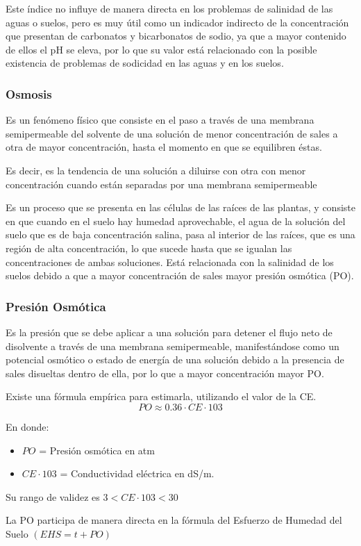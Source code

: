 Este índice no influye de manera directa en los problemas de salinidad de las aguas o suelos, pero es muy útil como un indicador indirecto de la concentración que presentan de carbonatos y bicarbonatos de sodio, ya que a mayor contenido de ellos el pH se eleva, por lo que su valor está relacionado con la posible existencia de problemas de sodicidad en las aguas y en los suelos.

\subsubsection{Osmosis}
Es un fenómeno físico que consiste en el paso a través de una membrana semipermeable del solvente de una solución de menor concentración de sales a otra de mayor concentración, hasta el momento en que se equilibren éstas.

Es decir, es la tendencia de una solución a diluirse con otra con menor concentración cuando están separadas por una membrana semipermeable

Es un proceso que se presenta en las células de las raíces de las plantas, y consiste en que cuando en el suelo hay humedad aprovechable, el agua de la solución del suelo que es de baja concentración salina, pasa al interior de las raíces, que es una región de alta concentración, lo que sucede hasta que se igualan las concentraciones de ambas soluciones. Está relacionada con la salinidad de los suelos debido a que a mayor concentración de sales mayor presión osmótica (PO).

\subsubsection{Presión Osmótica}
Es la presión que se debe aplicar a una solución para detener el flujo neto de disolvente a través de una membrana semipermeable, manifestándose como un potencial osmótico o estado de energía de una solución debido a la presencia de sales disueltas dentro de ella, por lo que a mayor concentración mayor PO.

Existe una fórmula empírica para estimarla, utilizando el valor de la CE.
\begin{equation}
  PO \approx 0.36 \cdot CE \cdot 103
\end{equation}
\begin{notation}
  En donde:
  \begin{itemize}
    \item $PO$ = Presión osmótica en atm
    \item $CE \cdot 103$ = Conductividad eléctrica en dS/m.
  \end{itemize}
  Su rango de validez es $3 < CE\cdot 103 < 30$
\end{notation}
La PO participa de manera directa en la fórmula del Esfuerzo de Humedad del Suelo $(EHS = t + PO)$
